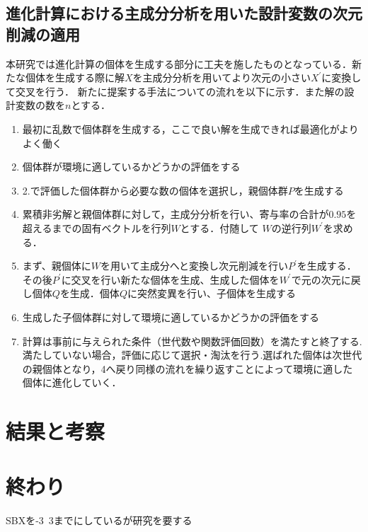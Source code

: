 \documentclass[11pt,a4j,notitlepage]{jsarticle}
\begin{document}
\subsection{進化計算における主成分分析を用いた設計変数の次元削減の適用}
\vspace{-1.0zh}
本研究では進化計算の個体を生成する部分に工夫を施したものとなっている．新たな個体を生成する際に解$X$を主成分分析を用いてより次元の小さい$X^{\prime}$に変換して交叉を行う．
新たに提案する手法についての流れを以下に示す．また解の設計変数の数を$n$とする．
\vspace{-1.5zh}
\begin{enumerate}
  \item 最初に乱数で個体群を生成する，ここで良い解を生成できれば最適化がよりよく働く
  \item 個体群が環境に適しているかどうかの評価をする
  \item 2.で評価した個体群から必要な数の個体を選択し，親個体群$P$を生成する
  \item 累積非劣解と親個体群に対して，主成分分析を行い、寄与率の合計が$0.95$を超えるまでの固有ベクトルを行列$W$とする．付随して $W$の逆行列$W^{\prime}$を求める．
  \item まず、親個体に$W$を用いて主成分へと変換し次元削減を行い$P^{\prime}$を生成する．その後$P^{\prime}$に交叉を行い新たな個体を生成、生成した個体を$W^{\prime}$で元の次元に戻し個体$Q$を生成．個体$Q$に突然変異を行い、子個体を生成する
  \item 生成した子個体群に対して環境に適しているかどうかの評価をする
  \item 計算は事前に与えられた条件（世代数や関数評価回数）を満たすと終了する.満たしていない場合，評価に応じて選択・淘汰を行う.選ばれた個体は次世代の親個体となり，4へ戻り同様の流れを繰り返すことによって環境に適した個体に進化していく．
\end{enumerate}
\vspace{-1.5zh}
\section{結果と考察}
\vspace{-1.0zh}

\section{終わり}
\vspace{-1.0zh}
SBXを-3~3までにしているが研究を要する
\end{document}
